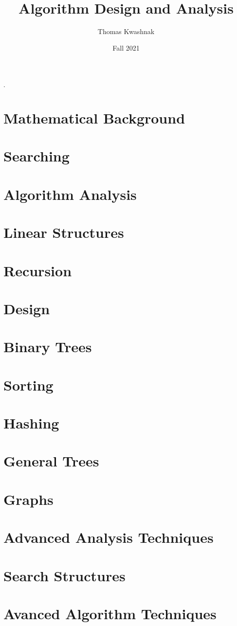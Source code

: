 \documentclass[10pt]{article}
\title{Algorithm Design and Analysis}
\date{Fall 2021}
\author{Thomas Kwashnak}
\begin{document}
\maketitle

\setlength{\parindent}{0pt}.
\setlength{\parskip}{\baselineskip}
\lstset{numbers=left, numberstyle=\footnotesize, frame=l} 

\newpage
\tableofcontents
\newpage


\section{Mathematical Background}
\newpage
\section{Searching}
\newpage
\section{Algorithm Analysis}
\newpage
\section{Linear Structures}
\newpage
\section{Recursion}
\newpage
\section{Design}
\newpage
\section{Binary Trees}
\newpage
\section{Sorting}
\newpage
\section{Hashing}
\newpage
\section{General Trees}
\newpage
\section{Graphs}
\newpage
\section{Advanced Analysis Techniques}
\newpage
\section{Search Structures}
\newpage
\section{Avanced Algorithm Techniques}
\end{document}
